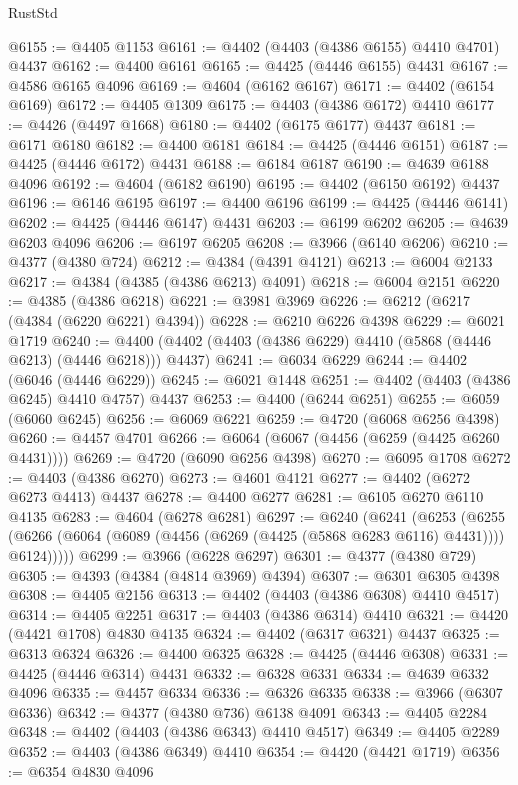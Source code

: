 \begin{lexlean}{RustStd}
\begin{coremodule}
@6155 := @4405 @1153
@6161 := @4402 (@4403 (@4386 @6155) @4410 @4701) @4437
@6162 := @4400 @6161
@6165 := @4425 (@4446 @6155) @4431
@6167 := @4586 @6165 @4096
@6169 := @4604 (@6162 @6167)
@6171 := @4402 (@6154 @6169)
@6172 := @4405 @1309
@6175 := @4403 (@4386 @6172) @4410
@6177 := @4426 (@4497 @1668)
@6180 := @4402 (@6175 @6177) @4437
@6181 := @6171 @6180
@6182 := @4400 @6181
@6184 := @4425 (@4446 @6151)
@6187 := @4425 (@4446 @6172) @4431
@6188 := @6184 @6187
@6190 := @4639 @6188 @4096
@6192 := @4604 (@6182 @6190)
@6195 := @4402 (@6150 @6192) @4437
@6196 := @6146 @6195
@6197 := @4400 @6196
@6199 := @4425 (@4446 @6141)
@6202 := @4425 (@4446 @6147) @4431
@6203 := @6199 @6202
@6205 := @4639 @6203 @4096
@6206 := @6197 @6205
@6208 := @3966 (@6140 @6206)
@6210 := @4377 (@4380 @724)
@6212 := @4384 (@4391 @4121)
@6213 := @6004 @2133
@6217 := @4384 (@4385 (@4386 @6213) @4091)
@6218 := @6004 @2151
@6220 := @4385 (@4386 @6218)
@6221 := @3981 @3969
@6226 := @6212 (@6217 (@4384 (@6220 @6221) @4394))
@6228 := @6210 @6226 @4398
@6229 := @6021 @1719
@6240 := @4400 (@4402 (@4403 (@4386 @6229) @4410 (@5868 (@4446 @6213) (@4446 @6218))) @4437)
@6241 := @6034 @6229
@6244 := @4402 (@6046 (@4446 @6229))
@6245 := @6021 @1448
@6251 := @4402 (@4403 (@4386 @6245) @4410 @4757) @4437
@6253 := @4400 (@6244 @6251)
@6255 := @6059 (@6060 @6245)
@6256 := @6069 @6221
@6259 := @4720 (@6068 @6256 @4398)
@6260 := @4457 @4701
@6266 := @6064 (@6067 (@4456 (@6259 (@4425 @6260 @4431))))
@6269 := @4720 (@6090 @6256 @4398)
@6270 := @6095 @1708
@6272 := @4403 (@4386 @6270)
@6273 := @4601 @4121
@6277 := @4402 (@6272 @6273 @4413) @4437
@6278 := @4400 @6277
@6281 := @6105 @6270 @6110 @4135
@6283 := @4604 (@6278 @6281)
@6297 := @6240
    (@6241
      (@6253
        (@6255 (@6266 (@6064 (@6089 (@4456 (@6269 (@4425 (@5868 @6283 @6116) @4431)))) @6124)))))
@6299 := @3966 (@6228 @6297)
@6301 := @4377 (@4380 @729)
@6305 := @4393 (@4384 (@4814 @3969) @4394)
@6307 := @6301 @6305 @4398
@6308 := @4405 @2156
@6313 := @4402 (@4403 (@4386 @6308) @4410 @4517)
@6314 := @4405 @2251
@6317 := @4403 (@4386 @6314) @4410
@6321 := @4420 (@4421 @1708) @4830 @4135
@6324 := @4402 (@6317 @6321) @4437
@6325 := @6313 @6324
@6326 := @4400 @6325
@6328 := @4425 (@4446 @6308)
@6331 := @4425 (@4446 @6314) @4431
@6332 := @6328 @6331
@6334 := @4639 @6332 @4096
@6335 := @4457 @6334
@6336 := @6326 @6335
@6338 := @3966 (@6307 @6336)
@6342 := @4377 (@4380 @736) @6138 @4091
@6343 := @4405 @2284
@6348 := @4402 (@4403 (@4386 @6343) @4410 @4517)
@6349 := @4405 @2289
@6352 := @4403 (@4386 @6349) @4410
@6354 := @4420 (@4421 @1719)
@6356 := @6354 @4830 @4096

\end{coremodule}
\end{lexlean}
